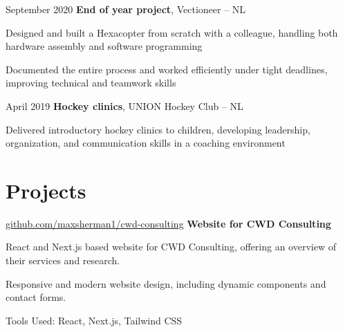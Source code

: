 	\vspace{0.2 cm}
	
	\begin{twocolentry}{
			September 2020
		}
		\textbf{End of year project}, Vectioneer -- NL
	\end{twocolentry}
	
	\vspace{0.10 cm}
	\begin{onecolentry}
		\begin{highlights}
			\item Designed and built a Hexacopter from scratch with a colleague, handling both hardware assembly and software programming
			\item Documented the entire process and worked efficiently under tight deadlines, improving technical and teamwork skills
		\end{highlights}
	\end{onecolentry}
	
	\vspace{0.2 cm}
	
	\begin{twocolentry}{
			April 2019
		}
		\textbf{Hockey clinics}, UNION Hockey Club -- NL
	\end{twocolentry}
	
	\vspace{0.10 cm}
	\begin{onecolentry}
		\begin{highlights}
			\item Delivered introductory hockey clinics to children, developing leadership, organization, and communication skills in a coaching environment
		\end{highlights}
	\end{onecolentry}
	
	\section{Projects}
	
	\begin{splitcolentry}{
			\href{https://github.com/maxsherman1/cwd-consulting}{github.com/maxsherman1/cwd-consulting}
		}
		\textbf{Website for CWD Consulting}
	\end{splitcolentry}
	
	\vspace{0.10 cm}
	\begin{onecolentry}
		\begin{highlights}
			\item React and Next.js based website for CWD Consulting, offering an overview of their services and research. 
			\item Responsive and modern website design, including dynamic components and contact forms.	
			\item Tools Used: React, Next.js, Tailwind CSS		\end{highlights}
	\end{onecolentry}
	
